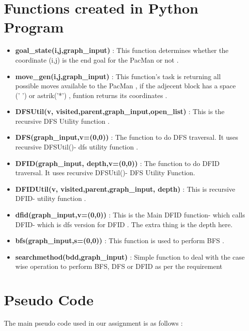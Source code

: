 \documentclass{article}
\begin{document}
\section{Functions created in Python Program}
\vspace{20pt}
\begin{itemize}
    \item \textbf{goal\_state(i,j,graph\_input)} : This function determines whether the coordinate (i,j) is the end goal for the PacMan or not .
    \item \textbf{move\_gen(i,j,graph\_input)} : This function's task is returning all \\possible moves available to the PacMan
    , if the adjecent block has a space\\(' ') or astrik('*') 
    , funtion returns its coordinates .
    \item \textbf{DFSUtil(v, visited,parent,graph\_input,open\_list)} : This is the recursive DFS Utility function .
    \item \textbf{DFS(graph\_input,v=(0,0))} : The function to do DFS traversal. It uses recursive DFSUtil()- dfs utility function .
    \item \textbf{DFID(graph\_input, depth,v=(0,0))} : The function to do DFID traversal. It uses recursive DFSUtil()- DFS Utility Function.
    \item \textbf{DFIDUtil(v, visited,parent,graph\_input, depth)} : This is recursive DFID- utility function .
    \item \textbf{dfid(graph\_input,v=(0,0))} :  This is the Main DFID function- which calls DFID- which is dfs version for DFID . The extra thing is the depth here.
    \item \textbf{bfs(graph\_input,s=(0,0))} : This function is used to perform BFS .
    \item \textbf{searchmethod(bdd,graph\_input)} : Simple function to deal with the case wise operation to perform BFS, DFS or DFID as per the requirement
\end{itemize}
\newpage
\section{Pseudo Code}
The main pseudo code used in our assignment is as follows :
\end{document}
